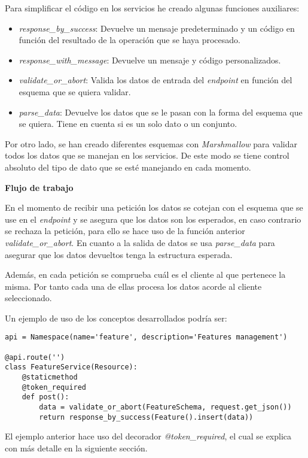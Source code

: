 \bigskip
Para simplificar el código en los servicios he creado algunas funciones auxiliares:
\begin{itemize}
	\item \textit{response\_by\_success}: Devuelve un mensaje predeterminado y un código en función del resultado de la operación que se haya procesado.
	\item \textit{response\_with\_message}: Devuelve un mensaje y código personalizados.
	\item \textit{validate\_or\_abort}: Valida los datos de entrada del \textit{endpoint} en función del esquema que se quiera validar.
	\item \textit{parse\_data}: Devuelve los datos que se le pasan con la forma del esquema que se quiera. Tiene en cuenta si es un solo dato o un conjunto.
\end{itemize}

Por otro lado, se han creado diferentes esquemas con \textit{Marshmallow} para validar todos los datos que se manejan en los servicios. De este modo se tiene control absoluto del tipo de dato que se esté manejando en cada momento.

\bigskip
\textbf{Flujo de trabajo}

En el momento de recibir una petición los datos se cotejan con el esquema que se use en el \textit{endpoint} y se asegura que los datos son los esperados, en caso contrario se rechaza la petición, para ello se hace uso de la función anterior \textit{validate\_or\_abort}. En cuanto a la salida de datos se usa \textit{parse\_data} para asegurar que los datos devueltos tenga la estructura esperada.

Además, en cada petición se comprueba cuál es el cliente al que pertenece la misma. Por tanto cada una de ellas procesa los datos acorde al cliente seleccionado.

\smallskip
Un ejemplo de uso de los conceptos desarrollados podría ser:
\begin{lstlisting}
api = Namespace(name='feature', description='Features management')

@api.route('')
class FeatureService(Resource):
	@staticmethod
	@token_required
	def post():
		data = validate_or_abort(FeatureSchema, request.get_json())
		return response_by_success(Feature().insert(data))
\end{lstlisting}

El ejemplo anterior hace uso del decorador \textit{@token\_required}, el cual se explica con más detalle en la siguiente sección.

